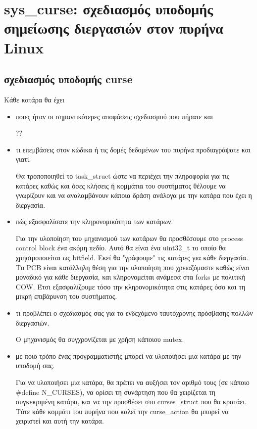 \documentclass[a4paper,11pt]{article} \usepackage{anysize}
\begin{document}
\renewcommand{\theenumi}{\roman{enumi}}


\section*{sys\_curse: σχεδιασμός υποδομής σημείωσης διεργασιών στον πυρήνα Linux}
\subsection*{σχεδιασμός υποδομής curse}
Κάθε κατάρα θα έχει
\begin{itemize}
    \item ποιες ήταν οι σημαντικότερες αποφάσεις σχεδιασμού που πήρατε και 

        ??

    \item τι επεμβάσεις στον κώδικα ή τις δομές δεδομένων του πυρήνα προδιαγράψατε και γιατί.

        Θα τροποποιηθεί το task\_struct ώστε να περιέχει την πληροφορία για
        τις κατάρες καθώς και όσες κλήσεις ή κομμάτια του συστήματος θέλουμε
        να γνωρίζουν και να αναλαμβάνουν κάποια δράση ανάλογα με την κατάρα
        που έχει η διεργασία.

    \item πώς εξασφαλίσατε την κληρονομικότητα των κατάρων.

        Για την υλοποίηση του μηχανισμού των κατάρων θα προσθέσουμε στο
        process control block ένα ακόμη πεδίο. Αυτό θα είναι ένα uint32\_t το
        οποίο θα χρησιμοποιείται ως bitfield. Εκεί θα "γράφουμε" τις κατάρες
        για κάθε διεργασία. Το PCB είναι κατάλληλη θέση για την υλοποίηση που
        χρειαζόμαστε καθώς είναι μοναδικό για κάθε διεργασία, και
        κληρονομείται ανάμεσα στα forks με πολιτική COW. Έτσι εξασφαλίζουμε
        τόσο την κληρονομικότητα στις κατάρες όσο και τη μικρή επιβάρυνση του
        συστήματος.

    \item τι προβλέπει ο σχεδιασμός σας για το ενδεχόμενο ταυτόχρονης πρόσβασης πολλών διεργασιών.

        Ο μηχανισμός θα συγχρονίζεται με χρήση κάποιου mutex.

    \item με ποιο τρόπο ένας προγραμματιστής μπορεί να υλοποιήσει μια κατάρα με την υποδομή σας.

        Για να υλοποιήσει μια κατάρα, θα πρέπει να αυξήσει τον αριθμό τους
        (σε κάποιο \#define N\_CURSES), να ορίσει τη συνάρτηση που θα χειρίζεται
        τη συγκεκριμένη κατάρα, και να την προσθέσει στο curses\_struct που θα
        κρατάει. Τότε κάθε κομμάτι του πυρήνα που καλεί την curse\_action θα
        μπορεί να χειριστεί και αυτή την κατάρα. 


\end{itemize}
\end{document}
